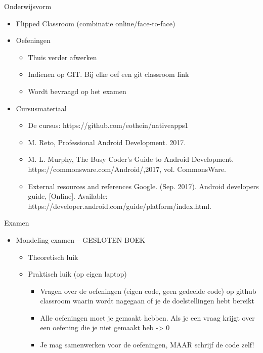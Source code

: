 \documentclass{beamer}
\begin{document}
\begin{frame}{Onderwijsvorm}
\begin{itemize}
	\item Flipped Classroom (combinatie online/face-to-face)
	\item Oefeningen
	\begin{itemize}
	\item Thuis verder afwerken
	\item Indienen op GIT. Bij elke oef een git classroom link
	\item Wordt bevraagd op het examen
\end{itemize}

	\item Cursusmateriaal
	\begin{itemize}
		\item De cursus: https://github.com/eothein/nativeapps1
		\item M. Reto, Professional Android Development. 2017.
		\item 	M. L. Murphy, The Busy Coder’s Guide to Android Development. https://commonsware.com/Android/,2017, vol. CommonsWare.
		
		\item External resources and references Google. (Sep. 2017). Android developers guide, [Online]. Available: https://developer.android.com/guide/platform/index.html.
		
	\end{itemize}
\end{itemize}

\end{frame}

\begin{frame}{Examen}
\begin{itemize}
	\item Mondeling examen – GESLOTEN BOEK
	\begin{itemize}
	\item Theoretisch luik 
	\item Praktisch luik (op eigen laptop)
	\begin{itemize}
	\item Vragen over de oefeningen (eigen code, geen gedeelde code) op github classroom waarin wordt nagegaan of je de doelstellingen hebt bereikt 
	\item Alle oefeningen moet je gemaakt hebben. Als je een vraag krijgt over een oefening die je niet gemaakt heb -> 0
	\item Je mag samenwerken voor de oefeningen, MAAR schrijf de code zelf!\\
		\end{itemize}
		\end{itemize}
		\end{itemize}
\end{frame}
\end{document}
